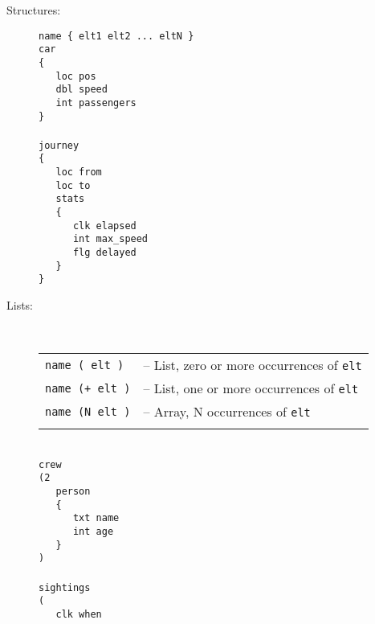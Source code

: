 \documentclass[12pt,a4paper,twoside]{article}
\renewcommand{\_}{\texttt{\symbol{95}}}
\begin{document}
\begin{description}
\item[Structures:]
	\verb^name { elt1 elt2 ... eltN }^\\
   \verb^car^\\
   \verb^{^\\
   \verb^   loc pos^\\
   \verb^   dbl speed^\\
   \verb^   int passengers^\\
   \verb^}^\\
	\\
   \verb^journey^\\
   \verb^{^\\
   \verb^   loc from^\\
   \verb^   loc to^\\
   \verb^   stats^\\
   \verb^   {^\\
   \verb^      clk elapsed^\\
   \verb^      int max_speed^\\
	\verb^      flg delayed^\\
   \verb^   }^\\
   \verb^}^\\
\item[Lists:]~\\
	\begin{tabular}{ll}
	\verb^name ( elt )^ & -- List, zero or more occurrences of \verb^elt^\\
	\verb^name (+ elt )^ & -- List, one or more occurrences of \verb^elt^\\
	\verb^name (N elt )^ & -- Array, N occurrences of \verb^elt^\\
	\\
	\end{tabular}\\
   \verb^crew^\\
   \verb^(2^\\
   \verb^   person^\\
   \verb^   {^\\
   \verb^      txt name^\\
   \verb^      int age^\\
   \verb^   }^\\
   \verb^)^\\
	\\
   \verb^sightings^\\
   \verb^(^\\
   \verb^   clk when^\\

\end{description}
\end{document}
